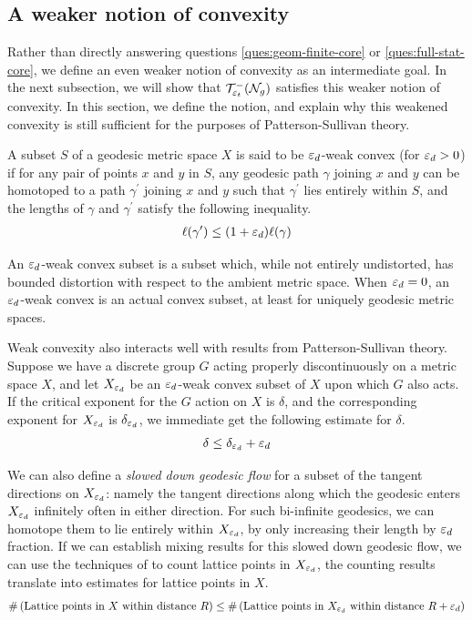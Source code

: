 \documentclass[12pt, reqno]{amsart}
\begin{document}
\subsection{A weaker notion of convexity}
\label{sec:weak-noti-conv}

Rather than directly answering questions \ref{ques:geom-finite-core} or \ref{ques:full-stat-core}, we define an even weaker notion of convexity as an intermediate goal.
In the next subsection, we will show that $\mathcal{T}_{\varepsilon_t}^{-}(\mathcal{N}_g)$ satisfies this weaker notion of convexity.
In this section, we define the notion, and explain why this weakened convexity is still sufficient for the purposes of Patterson-Sullivan theory.

\begin{definition}
  A subset $S$ of a geodesic metric space $X$ is said to be $\varepsilon_d$-weak convex (for $\varepsilon_d > 0$) if for any pair of points $x$ and $y$ in $S$, any geodesic path $\gamma$ joining $x$ and $y$ can be homotoped to a path $\gamma^{\prime}$ joining $x$ and $y$ such that $\gamma^{\prime}$ lies entirely within $S$, and the lengths of $\gamma$ and $\gamma^{\prime}$ satisfy the following inequality.
  \begin{align*}
    \ell(\gamma^{\prime}) \leq (1 + \varepsilon_d) \ell(\gamma)
  \end{align*}
\end{definition}

An $\varepsilon_d$-weak convex subset is a subset which, while not entirely undistorted, has bounded distortion with respect to the ambient metric space.
When $\varepsilon_d = 0$, an $\varepsilon_d$-weak convex is an actual convex subset, at least for uniquely geodesic metric spaces.

Weak convexity also interacts well with results from Patterson-Sullivan theory.
Suppose we have a discrete group $G$ acting properly discontinuously on a metric space $X$, and let $X_{\varepsilon_d}$ be an $\varepsilon_d$-weak convex subset of $X$ upon which $G$ also acts.
If the critical exponent for the $G$ action on $X$ is $\delta$, and the corresponding exponent for $X_{\varepsilon_d}$ is $\delta_{\varepsilon_d}$, we immediate get the following estimate for $\delta$.
\begin{align*}
  \delta \leq \delta_{\varepsilon_d} + \varepsilon_d
\end{align*}

We can also define a \emph{slowed down geodesic flow} for a subset of the tangent directions on $X_{\varepsilon_d}$: namely the tangent directions along which the geodesic enters $X_{\varepsilon_d}$ infinitely often in either direction.
For such bi-infinite geodesics, we can homotope them to lie entirely within $X_{\varepsilon_d}$, by only increasing their length by $\varepsilon_d$ fraction.
If we can establish mixing results for this slowed down geodesic flow, we can use the techniques of \textcite{roblin2003ergodicite} to count lattice points in $X_{\varepsilon_d}$, the counting results translate into estimates for lattice points in $X$.
\begin{align*}
  \#\left( \text{Lattice points in $X$ within distance $R$} \right) \leq \#\left( \text{Lattice points in $X_{\varepsilon_d}$ within distance $R + \varepsilon_d$} \right)
\end{align*}
\end{document}
